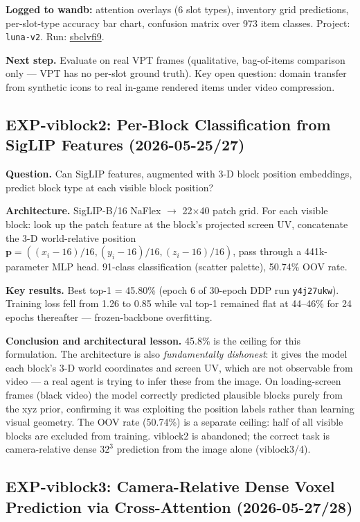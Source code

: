 \documentclass[11pt,a4paper]{article}
\begin{document}
\textbf{Logged to wandb:} attention overlays (6 slot types), inventory grid predictions, per-slot-type accuracy bar chart, confusion matrix over 973 item classes. Project: \texttt{luna-v2}. Run: \href{https://wandb.ai/venusisntprofessional-drexel-university/dropper/runs/sbclvfi9}{sbclvfi9}.

\textbf{Next step.} Evaluate on real VPT frames (qualitative, bag-of-items comparison only --- VPT has no per-slot ground truth). Key open question: domain transfer from synthetic icons to real in-game rendered items under video compression.

\subsection{EXP-viblock2: Per-Block Classification from SigLIP Features (2026-05-25/27)}

\textbf{Question.} Can SigLIP features, augmented with 3-D block position embeddings, predict block type at each visible block position?

\textbf{Architecture.} SigLIP-B/16 NaFlex $\to$ 22$\times$40 patch grid. For each visible block: look up the patch feature at the block's projected screen UV, concatenate the 3-D world-relative position $\mathbf{p} = ((x_i-16)/16, (y_i-16)/16, (z_i-16)/16)$, pass through a 441k-parameter MLP head. 91-class classification (scatter palette), 50.74\% OOV rate.

\textbf{Key results.} Best top-1 = 45.80\% (epoch 6 of 30-epoch DDP run \texttt{y4j27ukw}). Training loss fell from 1.26 to 0.85 while val top-1 remained flat at 44--46\% for 24 epochs thereafter --- frozen-backbone overfitting.

\textbf{Conclusion and architectural lesson.} 45.8\% is the ceiling for this formulation. The architecture is also \textit{fundamentally dishonest}: it gives the model each block's 3-D world coordinates and screen UV, which are not observable from video --- a real agent is trying to infer these from the image. On loading-screen frames (black video) the model correctly predicted plausible blocks purely from the xyz prior, confirming it was exploiting the position labels rather than learning visual geometry. The OOV rate (50.74\%) is a separate ceiling: half of all visible blocks are excluded from training. viblock2 is abandoned; the correct task is camera-relative dense $32^3$ prediction from the image alone (viblock3/4).

\subsection{EXP-viblock3: Camera-Relative Dense Voxel Prediction via Cross-Attention (2026-05-27/28)}
\end{document}
